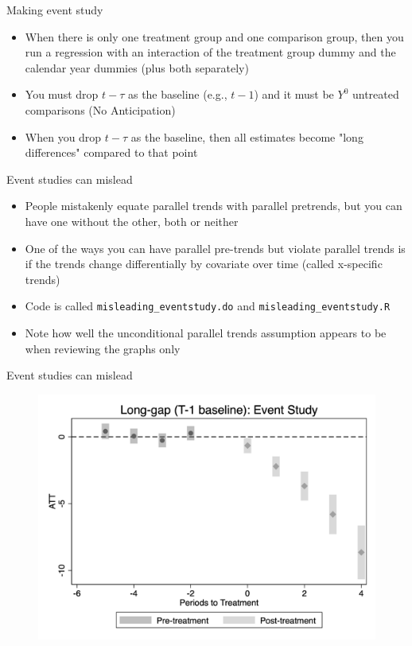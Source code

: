 \documentclass{beamer}
\begin{document}
\begin{frame}{Making event study}

\begin{itemize}
\item When there is only one treatment group and one comparison group, then you run a regression with an interaction of the treatment group dummy and the calendar year dummies (plus both separately)
\item You must drop $t-\tau$ as the baseline (e.g., $t-1$) and it must be $Y^0$ untreated comparisons (No Anticipation)
\item When you drop $t-\tau$ as the baseline, then all estimates become "long differences" compared to that point
\end{itemize}

\end{frame}



\begin{frame}{Event studies can mislead}

\begin{itemize}

\item People mistakenly equate parallel trends with parallel pretrends, but you can have one without the other, both or neither
\item One of the ways you can have parallel pre-trends but violate parallel trends is if the trends change differentially by covariate over time (called x-specific trends)
\item Code is called \texttt{misleading_eventstudy.do} and \texttt{misleading_eventstudy.R}
\item Note how well the unconditional parallel trends assumption appears to be when reviewing the graphs only
\end{itemize}

\end{frame}

\begin{frame}{Event studies can mislead}

\begin{figure}
    \centering
    \includegraphics[height=0.75\textheight]{./lecture_includes/es_flawed.png}
\end{figure}

\end{frame}
\end{document}
